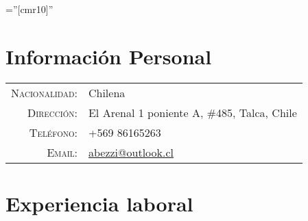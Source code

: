 \documentclass[a4paper,10pt]{article} %
\begin{document}
\pagestyle{empty} %

\font\fb=''[cmr10]'' %


\par{\bigskip\par} %

\section{Informaci\'on Personal}

\begin{tabular}{rl}
\textsc{Nacionalidad:} & Chilena \\
\textsc{Direcci\'on:} & El Arenal 1 poniente A, \#485, Talca, Chile \\
\textsc{Tel\'efono:} & +569 86165263\\
\textsc{Email:} & \href{mailto:abezzi@outlook.cl}{abezzi@outlook.cl}
\end{tabular}



\section{Experiencia laboral}
\end{document}
